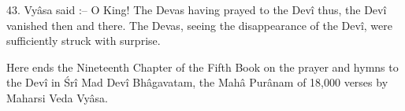43. Vy\^asa said :-- O King! The Devas having prayed to the Dev\^i thus, the Dev\^i vanished then and there. The Devas, seeing the disappearance of the Dev\^i, were sufficiently struck with surprise.

Here ends the Nineteenth Chapter of the Fifth Book on the prayer and hymns to the Dev\^i in \'Sr\^i Mad Dev\^i Bh\^agavatam, the Mah\^a Pur\^anam of 18,000 verses by Maharsi Veda Vy\^asa.